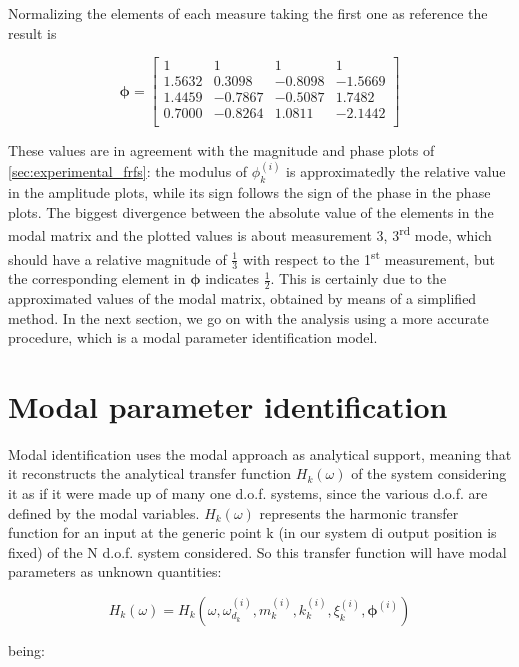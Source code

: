 \documentclass[a4paper,12pt,oneside]{article}
\begin{document}
Normalizing the elements of each measure taking the first one as reference the result is

\[
	\bm{\phi} =	\begin{bmatrix}
								1				& 1				& 1				& 1 \\
								1.5632	& 0.3098	& -0.8098	& -1.5669 \\
								1.4459	& -0.7867 & -0.5087	& 1.7482 \\
								0.7000	& -0.8264 & 1.0811	& -2.1442 \\
							\end{bmatrix}
\]

\vspace{10pt}

These values are in agreement with the magnitude and phase plots of \ref{sec:experimental_frfs}: the modulus of $ \phi^{(i)}_k $ is approximatedly the relative value in the amplitude plots, while its sign follows the sign of the phase in the phase plots. The biggest divergence between the absolute value of the elements in the modal matrix and the plotted values is about measurement 3, 3\textsuperscript{rd} mode, which should have a relative magnitude of $ \frac{1}{3} $ with respect to the 1\textsuperscript{st} measurement, but the corresponding element in $ \bm{\phi} $ indicates $ \frac{1}{2} $. This is certainly due to the approximated values of the modal matrix, obtained by means of a simplified method. In the next section, we go on with the analysis using a more accurate procedure, which is a modal parameter identification model.

\section{Modal parameter identification}
Modal identification uses the modal approach as analytical support, meaning that
it reconstructs the analytical transfer function $H_k( \omega) $ of the system considering it as if it were made up of many one d.o.f. systems, since the various d.o.f. are
defined by the modal variables. $H_k ( \omega) $ represents the harmonic transfer function for an input at the generic point k (in our system di output position is fixed) of the N d.o.f. system considered. So this transfer function will have modal parameters as
unknown quantities:

\[
	H_k ( \omega ) = H_k (\omega, \omega_{d_k}^{(i)} , m_k ^{(i)}, k_k ^{(i)},  \xi_k ^{(i)}, 	    	\mathbf{ \phi }^{(i)} )	
\]

being:
\end{document}
